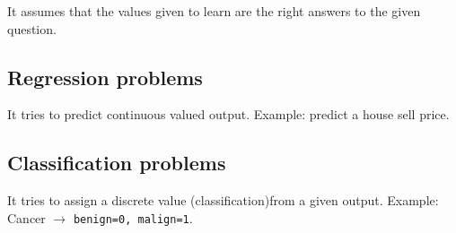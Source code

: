 \documentclass[a4paper]{report}
\begin{document}
    It assumes that the values given to learn are the right answers to the
    given question.

    \subsection{Regression problems}

      It tries to predict continuous valued output. Example: predict a house
      sell price.
      
    \subsection{Classification problems}

      It tries to assign a discrete value (classification)from a given output.
      Example: Cancer $\rightarrow$ \texttt{benign=0, malign=1}.
\end{document}
